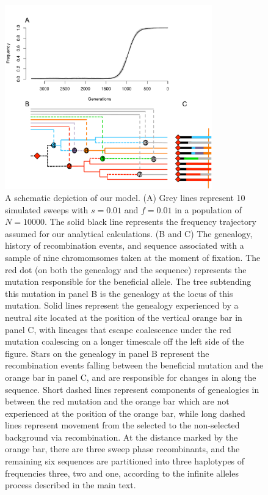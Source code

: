 \documentclass[a4paper,10pt]{article}
\begin{document}
\begin{figure}
	\includegraphics[width = 0.8\textwidth]{../Paper_Figures/SchematicFig1_6.pdf}
	\caption{A schematic depiction of our model. (A) Grey lines represent 10 simulated sweeps with $s=0.01$ and $f=0.01$ in a population of $N=10000$. The solid black line represents the frequency trajectory assumed for our analytical calculations. (B and C) The genealogy, history of recombination events, and sequence associated with a sample of nine chromomsomes taken at the moment of fixation. The red dot (on both the genealogy and the sequence) represents the mutation responsible for the beneficial allele. The tree subtending this mutation in panel B is the genealogy at the locus of this mutation. Solid lines represent the genealogy experienced by a neutral site located at the position of the vertical orange bar in panel C, with lineages that escape coalescence under the red mutation coalescing on a longer timescale off the left side of the figure. Stars on the genealogy in panel B represent the recombination events falling between the beneficial mutation and the orange bar in panel C, and are responsible for changes in along the sequence. Short dashed lines represent components of genealogies in between the red mutation and the orange bar which are not experienced at the position of the orange bar, while long dashed lines represent movement from the selected to the non-selected background via recombination. At the distance marked by the orange bar, there are three sweep phase recombinants, and the remaining six sequences are partitioned into three haplotypes of frequencies three, two and one, according to the infinite alleles process described in the main text.}
	\label{cartoon_fig_2}
\end{figure}
\end{document}
